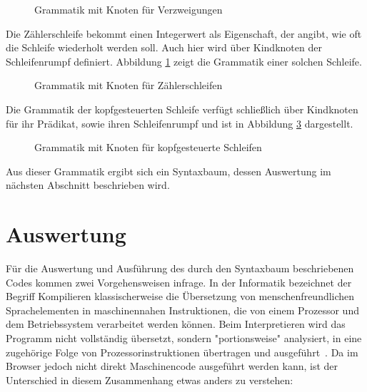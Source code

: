 \begin{figure}[h]
  
  \caption{Grammatik mit Knoten für Verzweigungen}
  \label{fig:implementation:grammar:6}
\end{figure}

Die Zählerschleife bekommt einen Integerwert als Eigenschaft, der angibt, wie oft die Schleife wiederholt werden soll. Auch hier wird über Kindknoten der Schleifenrumpf definiert. Abbildung \ref{fig:implementation:grammar:6} zeigt die Grammatik einer solchen Schleife.

\begin{figure}[h]
  
  \caption{Grammatik mit Knoten für Zählerschleifen}
  \label{fig:implementation:grammar:7}
\end{figure}

Die Grammatik der kopfgesteuerten Schleife verfügt schließlich über Kindknoten für ihr Prädikat, sowie ihren Schleifenrumpf und ist in Abbildung \ref{fig:implementation:grammar:8} dargestellt.

\begin{figure}[h]
  
  \caption{Grammatik mit Knoten für kopfgesteuerte Schleifen}
  \label{fig:implementation:grammar:8}
\end{figure}

Aus dieser Grammatik ergibt sich ein Syntaxbaum, dessen Auswertung im nächsten Abschnitt beschrieben wird.

\section{Auswertung}
\label{sec:implementation:evaluation}

Für die Auswertung und Ausführung des durch den Syntaxbaum beschriebenen Codes kommen zwei Vorgehensweisen infrage. In der Informatik bezeichnet der Begriff Kompilieren klassischerweise die Übersetzung von menschenfreundlichen Sprachelementen in maschinennahen Instruktionen, die von einem Prozessor und dem Betriebssystem verarbeitet werden können. Beim Interpretieren wird das Programm nicht vollständig übersetzt, sondern "portionsweise" analysiert, in eine zugehörige Folge von Prozessorinstruktionen übertragen und ausgeführt~\cite[47]{wagenknecht2009}. Da im Browser jedoch nicht direkt Maschinencode ausgeführt werden kann, ist der Unterschied in diesem Zusammenhang etwas anders zu verstehen:

